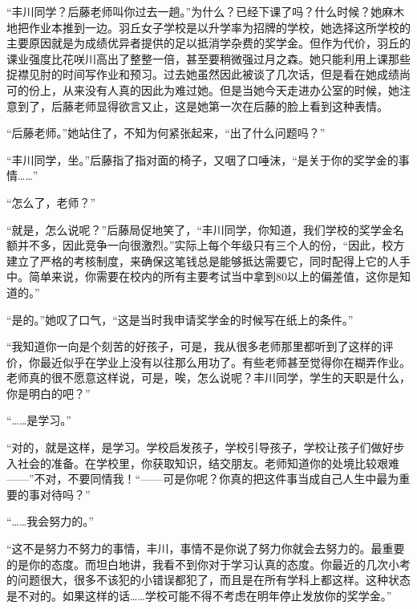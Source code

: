 \documentclass{article}
\begin{document}
“丰川同学？后藤老师叫你过去一趟。”为什么？已经下课了吗？什么时候？她麻木地把作业本推到一边。羽丘女子学校是以升学率为招牌的学校，她选择这所学校的主要原因就是为成绩优异者提供的足以抵消学杂费的奖学金。但作为代价，羽丘的课业强度比花咲川高出了整整一倍，甚至要稍微强过月之森。她只能利用上课那些捉襟见肘的时间写作业和预习。过去她虽然因此被谈了几次话，但是看在她成绩尚可的份上，从来没有人真的因此为难过她。但是当她今天走进办公室的时候，她注意到了，后藤老师显得欲言又止，这是她第一次在后藤的脸上看到这种表情。



“后藤老师。”她站住了，不知为何紧张起来，“出了什么问题吗？”



“丰川同学，坐。”后藤指了指对面的椅子，又咽了口唾沫，“是关于你的奖学金的事情……”



“怎么了，老师？”



“就是，怎么说呢？”后藤局促地笑了，“丰川同学，你知道，我们学校的奖学金名额并不多，因此竞争一向很激烈。”实际上每个年级只有三个人的份，“因此，校方建立了严格的考核制度，来确保这笔钱总是能够抵达需要它，同时配得上它的人手中。简单来说，你需要在校内的所有主要考试当中拿到80以上的偏差值，这你是知道的。”



“是的。”她叹了口气，“这是当时我申请奖学金的时候写在纸上的条件。”



“我知道你一向是个刻苦的好孩子，可是，我从很多老师那里都听到了这样的评价，你最近似乎在学业上没有以往那么用功了。有些老师甚至觉得你在糊弄作业。老师真的很不愿意这样说，可是，唉，怎么说呢？丰川同学，学生的天职是什么，你是明白的吧？”



“……是学习。”



“对的，就是这样，是学习。学校启发孩子，学校引导孩子，学校让孩子们做好步入社会的准备。在学校里，你获取知识，结交朋友。老师知道你的处境比较艰难——”不对，不要同情我！“——可是你呢？你真的把这件事当成自己人生中最为重要的事对待吗？”



“……我会努力的。”



“这不是努力不努力的事情，丰川，事情不是你说了努力你就会去努力的。最重要的是你的态度。而坦白地讲，我看不到你对于学习认真的态度。你最近的几次小考的问题很大，很多不该犯的小错误都犯了，而且是在所有学科上都这样。这种状态是不对的。如果这样的话……学校可能不得不考虑在明年停止发放你的奖学金。”
\end{document}
